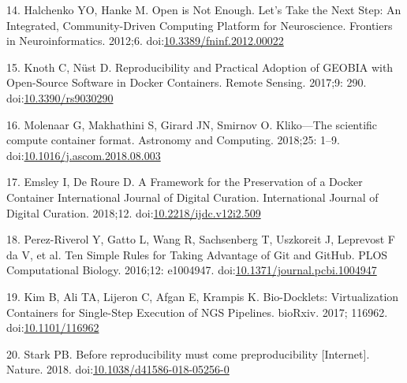 \documentclass[10pt,letterpaper]{article}
\begin{document}
\leavevmode\hypertarget{ref-halchenko_open_2012}{}%
14. Halchenko YO, Hanke M. Open is Not Enough. Let's Take the Next Step:
An Integrated, Community-Driven Computing Platform for Neuroscience.
Frontiers in Neuroinformatics. 2012;6.
doi:\href{https://doi.org/10.3389/fninf.2012.00022}{10.3389/fninf.2012.00022}

\leavevmode\hypertarget{ref-knoth_reproducibility_2017}{}%
15. Knoth C, Nüst D. Reproducibility and Practical Adoption of GEOBIA
with Open-Source Software in Docker Containers. Remote Sensing. 2017;9:
290. doi:\href{https://doi.org/10.3390/rs9030290}{10.3390/rs9030290}

\leavevmode\hypertarget{ref-molenaar_klikoscientific_2018}{}%
16. Molenaar G, Makhathini S, Girard JN, Smirnov O. Kliko---The
scientific compute container format. Astronomy and Computing. 2018;25:
1--9.
doi:\href{https://doi.org/10.1016/j.ascom.2018.08.003}{10.1016/j.ascom.2018.08.003}

\leavevmode\hypertarget{ref-emsley_framework_2018}{}%
17. Emsley I, De Roure D. A Framework for the Preservation of a Docker
Container International Journal of Digital Curation. International
Journal of Digital Curation. 2018;12.
doi:\href{https://doi.org/10.2218/ijdc.v12i2.509}{10.2218/ijdc.v12i2.509}

\leavevmode\hypertarget{ref-perez-riverol_ten_2016}{}%
18. Perez-Riverol Y, Gatto L, Wang R, Sachsenberg T, Uszkoreit J,
Leprevost F da V, et al. Ten Simple Rules for Taking Advantage of Git
and GitHub. PLOS Computational Biology. 2016;12: e1004947.
doi:\href{https://doi.org/10.1371/journal.pcbi.1004947}{10.1371/journal.pcbi.1004947}

\leavevmode\hypertarget{ref-kim_bio-docklets_2017}{}%
19. Kim B, Ali TA, Lijeron C, Afgan E, Krampis K. Bio-Docklets:
Virtualization Containers for Single-Step Execution of NGS Pipelines.
bioRxiv. 2017; 116962.
doi:\href{https://doi.org/10.1101/116962}{10.1101/116962}

\leavevmode\hypertarget{ref-stark_before_2018}{}%
20. Stark PB. Before reproducibility must come preproducibility
{[}Internet{]}. Nature. 2018.
doi:\href{https://doi.org/10.1038/d41586-018-05256-0}{10.1038/d41586-018-05256-0}

\nolinenumbers
\end{document}
